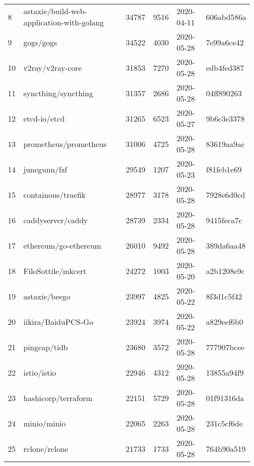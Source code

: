 \begin{longtable}{llrrll}
    8   &          astaxie/build-web-application-with-golang &  34787 &   9516 & 2020-04-11 &  606abd586a \\
    9   &                                          gogs/gogs &  34522 &   4030 & 2020-05-28 &  7e99a6ce42 \\
    10  &                                   v2ray/v2ray-core &  31853 &   7270 & 2020-05-28 &  edb4fed387 \\
    11  &                                syncthing/syncthing &  31357 &   2686 & 2020-05-28 &  04ff890263 \\
    12  &                                       etcd-io/etcd &  31265 &   6523 & 2020-05-27 &  9b6c3e3378 \\
    13  &                              prometheus/prometheus &  31006 &   4725 & 2020-05-28 &  83619aa9ac \\
    14  &                                       junegunn/fzf &  29549 &   1207 & 2020-05-23 &  f81feb1e69 \\
    15  &                                 containous/traefik &  28977 &   3178 & 2020-05-28 &  7928e6d0cd \\
    16  &                                  caddyserver/caddy &  28739 &   2334 & 2020-05-28 &  9415feca7c \\
    17  &                               ethereum/go-ethereum &  26010 &   9492 & 2020-05-28 &  389da6aa48 \\
    18  &                                 FiloSottile/mkcert &  24272 &   1003 & 2020-05-20 &  a2b1208e9c \\
    19  &                                      astaxie/beego &  23997 &   4825 & 2020-05-22 &  8f3d1c5f42 \\
    20  &                                 iikira/BaiduPCS-Go &  23924 &   3974 & 2020-05-22 &  a829eef6b0 \\
    21  &                                       pingcap/tidb &  23680 &   3572 & 2020-05-28 &  777907bcee \\
    22  &                                        istio/istio &  22946 &   4312 & 2020-05-28 &  13855a94f9 \\
    23  &                                hashicorp/terraform &  22151 &   5729 & 2020-05-28 &  01f91316da \\
    24  &                                        minio/minio &  22065 &   2263 & 2020-05-28 &  231c5cf6de \\
    25  &                                      rclone/rclone &  21733 &   1733 & 2020-05-28 &  764b90a519 \\

\end{longtable}
